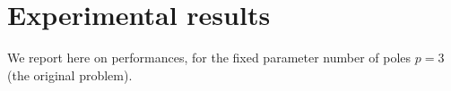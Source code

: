 \section{Experimental results}
\label{sec:perf}

We report here on performances, for the fixed parameter number of
poles $p=3$ (the original problem).



